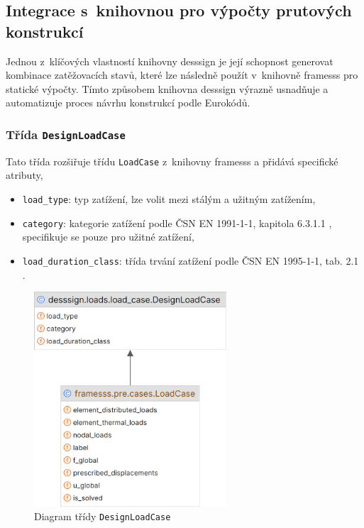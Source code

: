 \subsection{Integrace s~knihovnou pro výpočty prutových konstrukcí}
Jednou z~klíčových vlastností knihovny desssign je její schopnost generovat kombinace zatěžovacích stavů, které lze následně použít v~knihovně framesss pro statické výpočty. Tímto způsobem knihovna desssign výrazně usnadňuje a automatizuje proces návrhu konstrukcí podle Eurokódů.

\subsubsection*{Třída \texttt{DesignLoadCase}}
Tato třída rozšiřuje třídu \texttt{LoadCase} z~knihovny framesss a přidává specifické atributy, 
\begin{itemize}
    \item \texttt{load\_type}: typ zatížení, lze volit mezi stálým a užitným zatížením,
    \item \texttt{category}: kategorie zatížení podle ČSN EN 1991-1-1, kapitola 6.3.1.1 \cite{EN1991_1_1}, specifikuje se pouze pro užitné zatížení,
    \item \texttt{load\_duration\_class}: třída trvání zatížení podle ČSN EN 1995-1-1, tab. 2.1 \cite{EN1995_1_1}.
\end{itemize}

\begin{figure}[H]
    \includegraphics[height=8cm]{assets/figures/desssign/load_case.png}
    \caption{Diagram třídy \texttt{DesignLoadCase}}
    \label{fig:class_design_load_case}
\end{figure}

